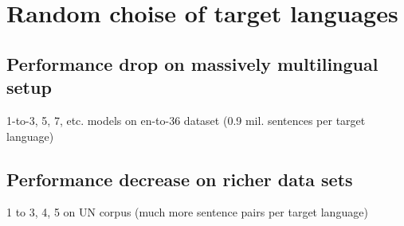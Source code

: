 \chapter{Random choise of target languages}

\section{Performance drop on massively multilingual setup}
1-to-3, 5, 7, etc. models on en-to-36 dataset (0.9 mil. sentences per target language)

\section{Performance decrease on richer data sets}
1 to 3, 4, 5 on UN corpus (much more sentence pairs per target language)
